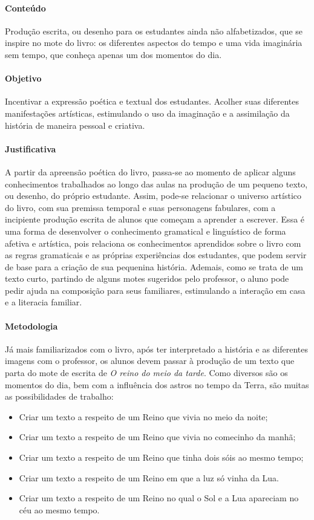\documentclass[11pt]{extarticle}
\begin{document}
\paragraph{Conteúdo} Produção escrita, ou desenho para os estudantes ainda não alfabetizados, que se inspire no mote do livro: os diferentes aspectos do tempo e uma vida imaginária sem tempo, que conheça apenas um dos momentos do dia.

\paragraph{Objetivo} Incentivar a expressão poética e textual dos estudantes. Acolher suas diferentes manifestações artísticas, estimulando o uso da imaginação e a assimilação da história de maneira pessoal e criativa.

\paragraph{Justificativa} A partir da apreensão poética do livro, passa-se ao momento de aplicar alguns conhecimentos trabalhados ao longo das aulas na produção de um pequeno texto, ou desenho, do próprio estudante. Assim, pode-se relacionar o universo artístico do livro, com sua premissa temporal e suas personagens fabulares, com a incipiente produção escrita de alunos que começam a aprender a escrever. Essa é uma forma de desenvolver o conhecimento gramatical e linguístico de forma afetiva e artística, pois relaciona os conhecimentos aprendidos sobre o livro com as regras gramaticais e as próprias experiências dos estudantes, que podem servir de base para a criação de sua pequenina história. Ademais, como se trata de um texto curto, partindo de alguns motes sugeridos pelo professor, o aluno pode pedir ajuda na composição para seus familiares, estimulando a interação em casa e a literacia familiar.

\paragraph{Metodologia} Já mais familiarizados com o livro, após ter interpretado a história e as diferentes imagens com o professor, os alunos devem passar à produção de um texto que parta do mote de escrita de \textit{O reino do meio da tarde}. Como diversos são os momentos do dia, bem com a influência dos astros no tempo da Terra, são muitas as possibilidades de trabalho:

\begin{itemize}
\item Criar um texto a respeito de um Reino que vivia no meio da noite;
\item Criar um texto a respeito de um Reino que vivia no comecinho da manhã;
\item Criar um texto a respeito de um Reino que tinha dois sóis ao mesmo tempo;
\item Criar um texto a respeito de um Reino em que a luz só vinha da Lua.
\item Criar um texto a respeito de um Reino no qual o Sol e a Lua apareciam no céu ao mesmo tempo.
\end{itemize}
\end{document}

